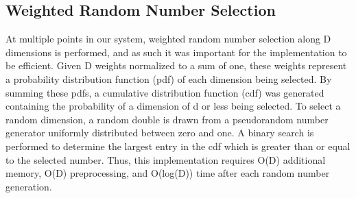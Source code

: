 \subsection{Weighted Random Number Selection}
\label{sec:rng}

At multiple points in our system, weighted random number selection along D dimensions is performed, and as such it was important for the implementation to be efficient.  Given D weights normalized to a sum of one, these weights represent a probability distribution function (pdf) of each dimension being selected.  By summing these pdfs, a cumulative distribution function (cdf) was generated containing the probability of a dimension of d or less being selected.  To select a random dimension, a random double is drawn from a pseudorandom number generator uniformly distributed between zero and one.  A binary search is performed to determine the largest entry in the cdf which is greater than or equal to the selected number.  Thus, this implementation requires O(D) additional memory, O(D) preprocessing, and O(log(D)) time after each random number generation.
